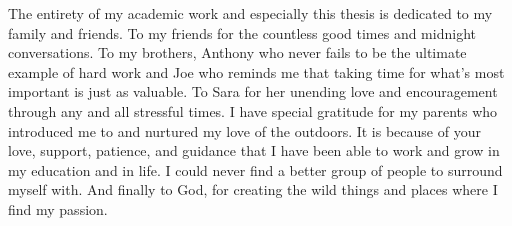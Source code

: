 
The entirety of my academic work and especially this thesis is dedicated to my family and friends. To my friends for the countless good times and midnight conversations. To my brothers, Anthony who never fails to be the ultimate example of hard work and Joe who reminds me that taking time for what’s most important is just as valuable. To Sara for her unending love and encouragement through any and all stressful times. I have special gratitude for my parents who introduced me to and nurtured my love of the outdoors.  It is because of your love, support, patience, and guidance that I have been able to work and grow in my education and in life. I could never find a better group of people to surround myself with. And finally to God, for creating the wild things and places where I find my passion. 